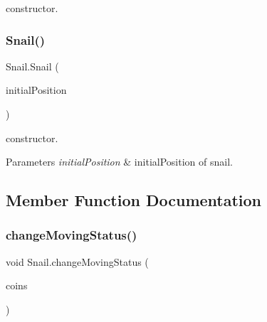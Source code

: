 constructor. \mbox{\label{class_snail_a5750040bdce708c8f89d6048c8deddf5}} 
\subsubsection{\texorpdfstring{Snail()}{Snail()}\hspace{0.1cm}{\footnotesize\ttfamily [2/2]}}
{\footnotesize\ttfamily Snail.\+Snail (\begin{DoxyParamCaption}\item[{\mbox{\hyperlink{class_position}{Position}}}]{initial\+Position }\end{DoxyParamCaption})\hspace{0.3cm}{\ttfamily [inline]}}

constructor. 
\begin{DoxyParams}{Parameters}
{\em initial\+Position} & initial\+Position of snail. \\
\hline
\end{DoxyParams}


\subsection{Member Function Documentation}
\mbox{\label{class_snail_a1ac3de4bd120dcfeae9ccc66918057e5}} 
\subsubsection{\texorpdfstring{change\+Moving\+Status()}{changeMovingStatus()}}
{\footnotesize\ttfamily void Snail.\+change\+Moving\+Status (\begin{DoxyParamCaption}\item[{\mbox{\hyperlink{class_linked_list}{Linked\+List}}$<$ \mbox{\hyperlink{class_coin}{Coin}} $>$}]{coins }\end{DoxyParamCaption})\hspace{0.3cm}{\ttfamily [inline]}}

